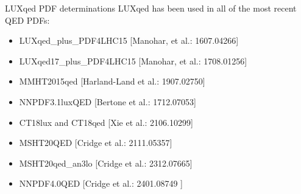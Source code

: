 \documentclass[aspectratio=169, 9pt,t]{beamer}
\begin{document}
\begin{frame}{LUXqed PDF determinations}
  LUXqed has been used in all of the most recent QED PDFs:
  \begin{itemize}
      \item LUXqed\_plus\_PDF4LHC15 {\color{gray}\small [Manohar, et al.: 1607.04266]}
      \item LUXqed17\_plus\_PDF4LHC15 {\color{gray}\small [Manohar, et al.: 1708.01256]}
      \item MMHT2015qed {\color{gray}\small [Harland-Land et al.: 1907.02750]}
      \item NNPDF3.1luxQED {\color{gray}\small [Bertone et al.: 1712.07053]}
      \item CT18lux and CT18qed {\color{gray}\small [Xie et al.: 2106.10299]}
      \item MSHT20QED {\color{gray}\small [Cridge et al.: 2111.05357]}
      \item MSHT20qed\_an3lo {\color{gray}\small [Cridge et al.: 2312.07665]}
      \item NNPDF4.0QED {\color{gray}\small [Cridge et al.: 2401.08749 ]}
  \end{itemize}
\end{frame}
\end{document}
